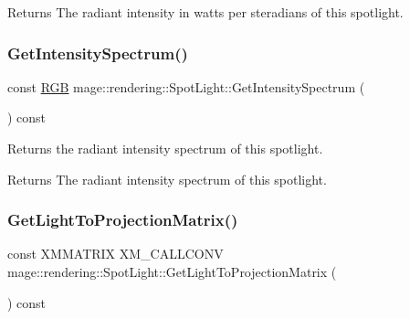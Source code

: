 \begin{DoxyReturn}{Returns}
The radiant intensity in watts per steradians of this spotlight. 
\end{DoxyReturn}
\hypertarget{classmage_1_1rendering_1_1_spot_light_a049401f9c26b106acddfcb7ec09b0418}{}\label{classmage_1_1rendering_1_1_spot_light_a049401f9c26b106acddfcb7ec09b0418} 
\subsubsection{\texorpdfstring{Get\+Intensity\+Spectrum()}{GetIntensitySpectrum()}}
{\footnotesize\ttfamily const \hyperlink{structmage_1_1_r_g_b}{R\+GB} mage\+::rendering\+::\+Spot\+Light\+::\+Get\+Intensity\+Spectrum (\begin{DoxyParamCaption}{ }\end{DoxyParamCaption}) const\hspace{0.3cm}{\ttfamily [noexcept]}}

Returns the radiant intensity spectrum of this spotlight.

\begin{DoxyReturn}{Returns}
The radiant intensity spectrum of this spotlight. 
\end{DoxyReturn}
\hypertarget{classmage_1_1rendering_1_1_spot_light_ad617d1c098e2ca222a9736b8c45fa0c8}{}\label{classmage_1_1rendering_1_1_spot_light_ad617d1c098e2ca222a9736b8c45fa0c8} 
\subsubsection{\texorpdfstring{Get\+Light\+To\+Projection\+Matrix()}{GetLightToProjectionMatrix()}}
{\footnotesize\ttfamily const X\+M\+M\+A\+T\+R\+IX X\+M\+\_\+\+C\+A\+L\+L\+C\+O\+NV mage\+::rendering\+::\+Spot\+Light\+::\+Get\+Light\+To\+Projection\+Matrix (\begin{DoxyParamCaption}{ }\end{DoxyParamCaption}) const\hspace{0.3cm}{\ttfamily [noexcept]}}

